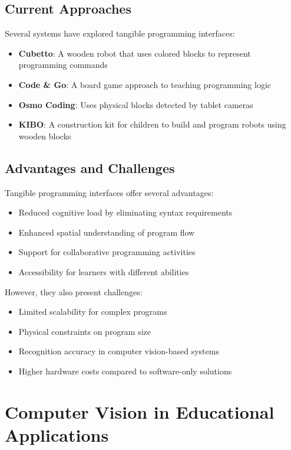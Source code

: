\subsection{Current Approaches}

Several systems have explored tangible programming interfaces:

\begin{itemize}
    \item \textbf{Cubetto}: A wooden robot that uses colored blocks to represent programming commands
    \item \textbf{Code \& Go}: A board game approach to teaching programming logic
    \item \textbf{Osmo Coding}: Uses physical blocks detected by tablet cameras
    \item \textbf{KIBO}: A construction kit for children to build and program robots using wooden blocks \cite{kazakoff2011putcode}
\end{itemize}

\subsection{Advantages and Challenges}

Tangible programming interfaces offer several advantages:
\begin{itemize}
    \item Reduced cognitive load by eliminating syntax requirements
    \item Enhanced spatial understanding of program flow
    \item Support for collaborative programming activities
    \item Accessibility for learners with different abilities
\end{itemize}

However, they also present challenges:
\begin{itemize}
    \item Limited scalability for complex programs
    \item Physical constraints on program size
    \item Recognition accuracy in computer vision-based systems
    \item Higher hardware costs compared to software-only solutions
\end{itemize}

\section{Computer Vision in Educational Applications}


